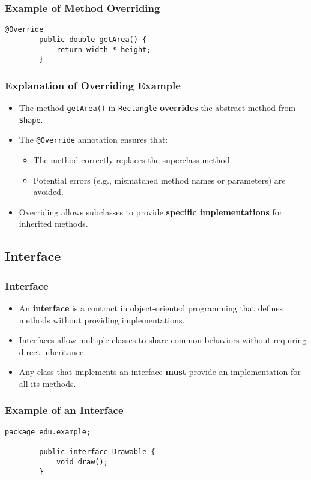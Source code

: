 \documentclass[aspectratio=169, table]{beamer}
\begin{document}
\begin{frame}[fragile]
	\frametitle{Example of Method Overriding}
	
	\begin{lstlisting}[style=JavaStyle, caption={Example of Overriding: \texttt{Rectangle.java}}]
		@Override
		public double getArea() {
			return width * height;
		}
	\end{lstlisting}
\end{frame}

\begin{frame}[fragile]
	\frametitle{Explanation of Overriding Example}
	
	\begin{itemize}
		\item The method \texttt{getArea()} in \texttt{Rectangle} \textbf{overrides} the abstract method from \texttt{Shape}.
		\item The \texttt{@Override} annotation ensures that:
		\begin{itemize}
			\item The method correctly replaces the superclass method.
			\item Potential errors (e.g., mismatched method names or parameters) are avoided.
		\end{itemize}
		\item Overriding allows subclasses to provide \textbf{specific implementations} for inherited methods.
	\end{itemize}
\end{frame}

\subsection{Interface}
\begin{frame}[fragile]
	\frametitle{Interface }
	
	\begin{itemize}
		\item An \textbf{interface} is a contract in object-oriented programming that defines methods without providing implementations.
		\item Interfaces allow multiple classes to share common behaviors without requiring direct inheritance.
		\item Any class that implements an interface \textbf{must} provide an implementation for all its methods.
	\end{itemize}
\end{frame}

\begin{frame}[fragile]
	\frametitle{Example of an Interface}
	
	\begin{lstlisting}[style=JavaStyle, caption={Example of an Interface: \texttt{Drawable.java}}]
		package edu.example;
		
		public interface Drawable {
			void draw();
		}
	\end{lstlisting}
\end{frame}
\end{document}
